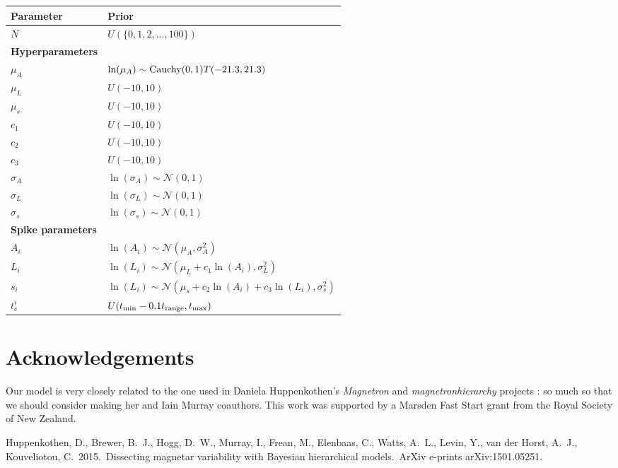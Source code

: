 \documentclass[a4paper, 11pt]{article}
\begin{document}
\begin{table}[!ht]
\begin{center}
\begin{tabular}{|l|l|}
\hline
Parameter			&		Prior\\
\hline
$N$					&		$U(\{0, 1, 2, ..., 100\})$\\
\hline
{\bf Hyperparameters}	&	\\
\hline
$\mu_A$				&		$\ln(\mu_A)\sim\textnormal{Cauchy}(0, 1)T(-21.3, 21.3)$\\
$\mu_L$				&		$U(-10, 10)$\\
$\mu_s$				&		$U(-10, 10)$\\
$c_1$				&		$U(-10, 10)$\\
$c_2$				&		$U(-10, 10)$\\
$c_3$				&		$U(-10, 10)$\\
$\sigma_A$			&		$\ln(\sigma_A) \sim \mathcal{N}(0, 1)$\\
$\sigma_L$			&		$\ln(\sigma_L) \sim \mathcal{N}(0, 1)$\\
$\sigma_s$			&		$\ln(\sigma_s) \sim \mathcal{N}(0, 1)$\\
\hline
{\bf Spike parameters}	&	\\
\hline
$A_i$				&	$\ln(A_i)\sim\mathcal{N}\left(\mu_A, \sigma_A^2\right)$\\
$L_i$				&	$\ln(L_i)\sim\mathcal{N}\left(\mu_L + c_1\ln(A_i), \sigma_L^2\right)$	\\
$s_i$				&	$\ln(L_i)\sim\mathcal{N}\left(\mu_s + c_2\ln(A_i) + c_3\ln(L_i), \sigma_s^2\right)$\\
$t_c^i$				&	$U(t_{\rm min} - 0.1t_{\rm range}, t_{\rm max})$\\
\hline
\end{tabular}
\end{center}
\end{table}

\section*{Acknowledgements}
Our model is very closely related to the one used in Daniela Huppenkothen's
{\it Magnetron} and {\it magnetronhierarchy} projects \citep{magnetron}: so
much so that we should consider making her and Iain Murray coauthors.
This work was supported by a Marsden Fast Start grant from the Royal Society of
New Zealand.

\begin{thebibliography}{}
 Huppenkothen, D., 
Brewer, B.~J., Hogg, D.~W., Murray, I., Frean, M., Elenbaas, C., Watts, 
A.~L., Levin, Y., van der Horst, A.~J., Kouveliotou, C.\ 2015.\ Dissecting 
magnetar variability with Bayesian hierarchical models.\ ArXiv e-prints 
arXiv:1501.05251.
\end{thebibliography}
\end{document}
